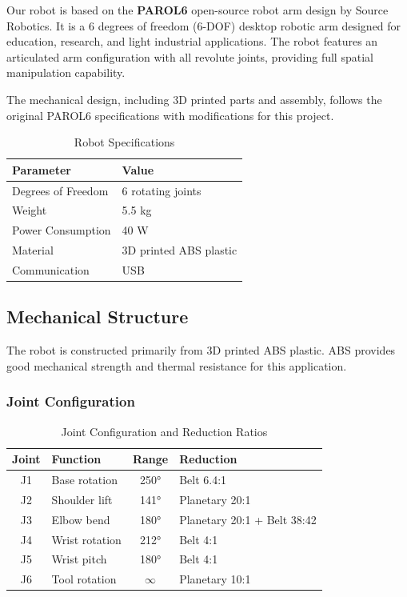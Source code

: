\documentclass[12pt,a4paper]{report}
\begin{document}
Our robot is based on the \textbf{PAROL6} open-source robot arm design by Source Robotics. It is a 6 degrees of freedom (6-DOF) desktop robotic arm designed for education, research, and light industrial applications. The robot features an articulated arm configuration with all revolute joints, providing full spatial manipulation capability.

The mechanical design, including 3D printed parts and assembly, follows the original PAROL6 specifications with modifications for this project.

\begin{table}[H]
    \centering
    \begin{tabular}{|l|l|}
        \hline
        \textbf{Parameter} & \textbf{Value} \\
        \hline
        Degrees of Freedom & 6 rotating joints \\
        Weight & 5.5 kg \\
        Power Consumption & 40 W \\
        Material & 3D printed ABS plastic \\
        Communication & USB \\
        \hline
    \end{tabular}
    \caption{Robot Specifications}
    \label{tab:robot_specs}
\end{table}

\subsection{Mechanical Structure}

The robot is constructed primarily from 3D printed ABS plastic. ABS provides good mechanical strength and thermal resistance for this application.

\subsubsection{Joint Configuration}

\begin{table}[H]
    \centering
    \begin{tabular}{|c|l|c|l|}
        \hline
        \textbf{Joint} & \textbf{Function} & \textbf{Range} & \textbf{Reduction} \\
        \hline
        J1 & Base rotation & 250° & Belt 6.4:1 \\
        J2 & Shoulder lift & 141° & Planetary 20:1 \\
        J3 & Elbow bend & 180° & Planetary 20:1 + Belt 38:42 \\
        J4 & Wrist rotation & 212° & Belt 4:1 \\
        J5 & Wrist pitch & 180° & Belt 4:1 \\
        J6 & Tool rotation & $\infty$ & Planetary 10:1 \\
        \hline
    \end{tabular}
    \caption{Joint Configuration and Reduction Ratios}
    \label{tab:joint_config}
\end{table}
\end{document}
